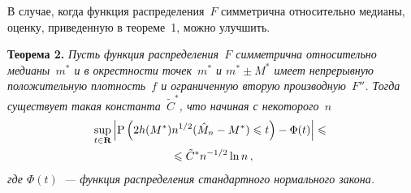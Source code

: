 \begin{multicols}{2}
В случае, когда функция распределения~$F$ симметрична относительно медианы, оценку, 
приведенную в теореме~1, можно улучшить.

\medskip

\noindent
\textbf{Теорема 2.} \textit{Пусть функция распределения~$F$ сим\-мет\-рич\-на относительно 
медианы~$m^*$ и в окрестности точек~$m^*$ и $m^*\pm M^*$ имеет непрерывную 
положительную плотность~$f$ и ограниченную вторую производную~$F''$. 
Тогда существует такая константа~$\tilde{C}^*$, что начиная с некоторого~$n$
\begin{multline}
\sup\limits_{t\in\mathbf{R}}\left\vert\mbox{P}\left(2h(M^*)n^{1/2}(\hat{M}_n-M^*)\leqslant 
t\right)-\Phi(t)\right\vert\leqslant{}\\
{}\leqslant \tilde{C}^*n^{-1/2}\ln n\,,
\label{e6-sh}
\end{multline}
где $\Phi(t)$~--- функция распределения стандартного нормального закона.}

\medskip


\end{multicols}
